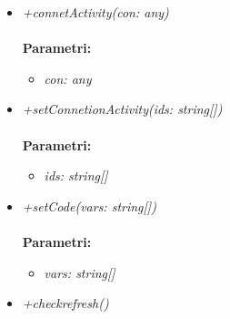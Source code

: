 \begin{itemize}
\begin{itemize}
\begin{itemize}
    		\end{itemize}
    		\item \emph{+connetActivity(con: any)}\\
    		\\
    		\textbf{Parametri:}
    		\begin{itemize}
    			\item \emph{con: any}\\
    			
    		\end{itemize}
    		\item \emph{+setConnetionActivity(ids: string[])}\\
    		\\
    		\textbf{Parametri:}
    		\begin{itemize}
    			\item \emph{ids: string[]}\\
    			
    		\end{itemize}
    		\item \emph{+setCode(vars: string[])}\\
    		\\
    		\textbf{Parametri:}
    		\begin{itemize}
    			\item \emph{vars: string[]}\\
    			
    		\end{itemize}
    		\item \emph{+checkrefresh()}\\
    		
		\end{itemize}
\end{itemize}